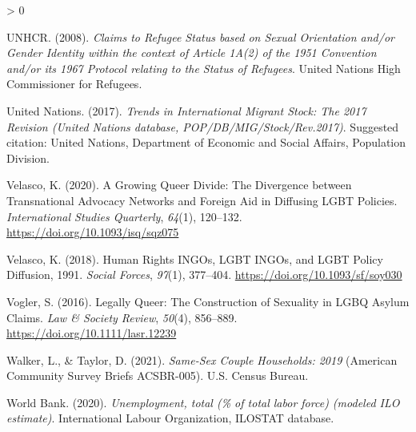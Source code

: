 \documentclass[
  11pt,
]{article}
\newlength{\cslhangindent}
\newenvironment{CSLReferences}[2] %
 {%
  \setlength{\parindent}{0pt}
  \ifodd #1 \everypar{\setlength{\hangindent}{\cslhangindent}}\ignorespaces\fi
  \ifnum #2 > 0
  \setlength{\parskip}{#2\baselineskip}
  \fi
 }%
 {}
\begin{document}
\begin{CSLReferences}{1}{0}
\leavevmode\hypertarget{ref-unhcr_2008}{}%
UNHCR. (2008). \emph{Claims to {Refugee Status} based on {Sexual Orientation} and/or {Gender Identity} within the context of {Article 1A}(2) of the 1951 {Convention} and/or its 1967 {Protocol} relating to the {Status} of {Refugees}}. {United Nations High Commissioner for Refugees}.

\leavevmode\hypertarget{ref-unitednations_2017}{}%
United Nations. (2017). \emph{Trends in {International Migrant Stock}: {The} 2017 {Revision} ({United Nations} database, {POP}/{DB}/{MIG}/{Stock}/{Rev}.2017)}. {Suggested citation: United Nations, Department of Economic and Social Affairs, Population Division}.

\leavevmode\hypertarget{ref-velasco_2020}{}%
Velasco, K. (2020). A {Growing Queer Divide}: {The Divergence} between {Transnational Advocacy Networks} and {Foreign Aid} in {Diffusing LGBT Policies}. \emph{International Studies Quarterly}, \emph{64}(1), 120--132. \url{https://doi.org/10.1093/isq/sqz075}

\leavevmode\hypertarget{ref-velasco_2018}{}%
Velasco, K. (2018). Human {Rights INGOs}, {LGBT INGOs}, and {LGBT Policy Diffusion}, 1991{}. \emph{Social Forces}, \emph{97}(1), 377--404. \url{https://doi.org/10.1093/sf/soy030}

\leavevmode\hypertarget{ref-vogler_2016}{}%
Vogler, S. (2016). Legally {Queer}: {The Construction} of {Sexuality} in {LGBQ Asylum Claims}. \emph{Law \& Society Review}, \emph{50}(4), 856--889. \url{https://doi.org/10.1111/lasr.12239}

\leavevmode\hypertarget{ref-walker_2021}{}%
Walker, L., \& Taylor, D. (2021). \emph{Same-{Sex Couple Households}: 2019} (American Community Survey Briefs ACSBR-005). {U.S. Census Bureau}.

\leavevmode\hypertarget{ref-worldbank_2020}{}%
World Bank. (2020). \emph{Unemployment, total (\% of total labor force) (modeled {ILO} estimate)}. {International Labour Organization, ILOSTAT database.}

\end{CSLReferences}
\end{document}
